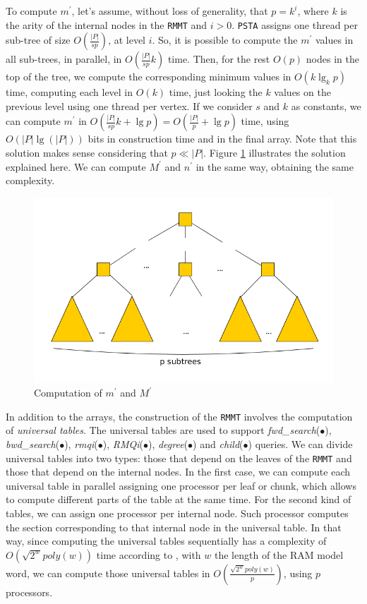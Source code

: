 To compute $m^{\prime}$, let's assume, without loss of generality,
that $p = k^{i}$, where $k$ is the arity
of the internal nodes in the {\tt RMMT} and $i > 0$. {\tt PSTA}
assigns one thread per sub-tree of size $O(\frac{|P|}{sp})$, at level
$i$. So, it is possible to compute the $m^{\prime}$ values in all
sub-trees, in parallel, in $O(\frac{|P|}{sp}k)$ time. Then, for the
rest $O(p)$ nodes in the top of the tree, we compute the corresponding
minimum values in $O(k\lg_{k} p)$ time, computing each level in $O(k)$
time, just looking the $k$ values on the previous level using one
thread per vertex. If we consider $s$ and $k$ as constants, we can compute
$m^{\prime}$ in
$O(\frac{|P|}{sp}k + \lg p) = O(\frac{|P|}{p}+\lg p)$ time,
using $O(|P|\lg(|P|))$ bits in construction time and in the
final array. Note that this solution makes sense considering that
$p\ll |P|$. Figure \ref{fig:min-max-array} illustrates the solution
explained here. We can compute $M^{\prime}$ and $n^{\prime}$ in the
same way, obtaining the same complexity.

\begin{figure}[ht]
  \centering
  \includegraphics[scale=0.28]{./images/Min-Max-array.png}
  \caption{Computation of $m^{\prime}$ and $M^{\prime}$}
  \label{fig:min-max-array} 
\end{figure}

In addition to the arrays, the construction of the {\tt RMMT} involves
the computation of \emph{universal tables}. The universal tables are
used to support \emph{fwd\_search}($\bullet$),
\emph{bwd\_search}($\bullet$), \emph{rmqi}($\bullet$),
\emph{RMQi}($\bullet$), \emph{degree}($\bullet$) and
\emph{child}($\bullet$) queries. We can divide
universal tables into two types: those that depend on the leaves of
the {\tt RMMT} and those that depend on the internal nodes. In the
first case, we can compute each universal table in parallel assigning
one processor per leaf or chunk, which allows to compute different
parts of the table at the same time. For the second kind of tables, we
can assign one processor per internal node. Such processor computes
the section corresponding to that internal node in the universal
table. In that way, since computing the universal tables sequentially
has a complexity of $O(\sqrt{2^{w}}poly(w))$ time according to
\cite{Navarro:2014:FFS:2620785.2601073}, with $w$ the length of the RAM model word, we can compute those
universal tables in $\displaystyle O(\frac{\sqrt{2^{w}}poly(w)}{p})$,
using $p$ processors.

